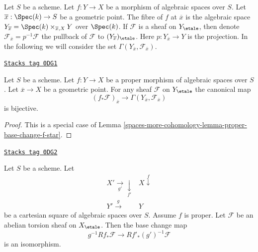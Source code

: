 Let $S$ be a scheme.
Let $f : Y \to X$ be a morphism of algebraic spaces over $S$. Let
$\overline{x} : \Spec(k) \to S$ be a geometric point. The fibre
of $f$ at $\overline{x}$ is the algebraic space
$Y_{\overline{x}} = \Spec(k) \times_{\overline{x}, X} Y$ over $\Spec(k)$.
If $\mathcal{F}$ is a sheaf on $Y_\etale$, then denote
$\mathcal{F}_{\overline{x}} = p^{-1}\mathcal{F}$
the pullback of $\mathcal{F}$ to $(Y_{\overline{x}})_\etale$.
Here $p : Y_{\overline{x}} \to Y$ is the projection.
In the following we will consider the set
$\Gamma(Y_{\overline{x}}, \mathcal{F}_{\overline{x}})$.

\begin{lemma}
\label{spaces-more-cohomology-lemma-proper-pushforward-stalk}
\href{https://stacks.math.columbia.edu/tag/0DG1}{\texttt{Stacks tag 0DG1}}

Let $S$ be a scheme.
Let $f : Y \to X$ be a proper morphism of algebraic spaces over $S$. Let
$\overline{x} \to X$ be a geometric point.
For any sheaf $\mathcal{F}$ on $Y_\etale$
the canonical map
$$
(f_*\mathcal{F})_{\overline{x}} \longrightarrow
\Gamma(Y_{\overline{x}}, \mathcal{F}_{\overline{x}})
$$
is bijective.
\end{lemma}

\begin{proof}
This is a special case of Lemma \ref{spaces-more-cohomology-lemma-proper-base-change-f-star}.
\end{proof}

\begin{theorem}
\label{spaces-more-cohomology-theorem-proper-base-change}
\href{https://stacks.math.columbia.edu/tag/0DG2}{\texttt{Stacks tag 0DG2}}

Let $S$ be a scheme. Let
$$
\begin{array}{cc}X' \underset{g'}{\longrightarrow}\underset{f'}{\downarrow} & X \overset{f}{\downarrow} \\ Y' \overset{g}{\longrightarrow} & Y\end{array}
$$
be a cartesian square of algebraic spaces over $S$.
Assume $f$ is proper.
Let $\mathcal{F}$ be an abelian torsion sheaf on $X_\etale$.
Then the base change map
$$
g^{-1}Rf_*\mathcal{F} \longrightarrow Rf'_*(g')^{-1}\mathcal{F}
$$
is an isomorphism.
\end{theorem}

